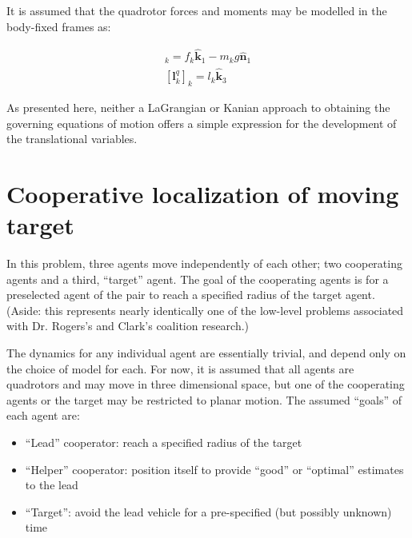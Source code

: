 \documentclass{aiaa-tc}
\newcommand{\br}[2]{[#1]_{#2}} %
\newcommand{\B}[1]{\textbf{#1}} %
\newcommand{\U}[1]{\hat{\textbf{#1}}} %
\begin{document}
It is assumed that the quadrotor forces and moments may be modelled in the body-fixed frames as:

\begin{align}
\br{\B{f}^q_k}{k} = f_k\U{k}_1 - m_k g \U{n}_1\\
\br{\B{l}^q_k}{k} = l_k\U{k}_3
\end{align}

As presented here, neither a LaGrangian or Kanian approach to obtaining the governing equations of motion offers a simple expression for the development of the translational variables.


\pagebreak
\section{Cooperative localization of moving target}

In this problem, three agents move independently of each other; two cooperating agents and a third, ``target'' agent. The goal of the cooperating agents is for a preselected agent of the pair to reach a specified radius of the target agent. (Aside: this represents nearly identically one of the low-level problems associated with Dr. Rogers's and Clark's coalition research.) 

The dynamics for any individual agent are essentially trivial, and depend only on the choice of model for each. For now, it is assumed that all agents are quadrotors and may move in three dimensional space, but one of the cooperating agents or the target may be restricted to planar motion. The assumed ``goals'' of each agent are:

\begin{itemize}
\item ``Lead'' cooperator: reach a specified radius of the target \\
\item ``Helper'' cooperator: position itself to provide ``good'' or ``optimal'' estimates to the lead \\
\item ``Target'': avoid the lead vehicle for a pre-specified (but possibly unknown) time
\end{itemize}
\end{document}
